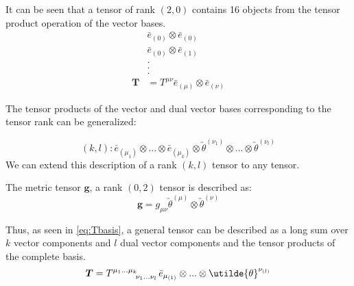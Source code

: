 \documentclass[11pt]{article}
\begin{document}
	It can be seen that a tensor of rank $(2,0)$ contains 16 objects from the tensor product operation of the vector bases.
	\begin{equation}
	\begin{aligned}
	&\bar{e}_{(0)} \otimes \bar{e}_{(0)}\\
	&\bar{e}_{(0)} \otimes \bar{e}_{(1)} \\
	&. \\
	&. \\
	&. \\
	\boldsymbol{T} &= T^{\mu\nu} \bar{e}_{(\mu)} \otimes \bar{e}_{(\nu)}
	\label{eq:Tobjects}
	\end{aligned}
	\end{equation}
	
	The tensor products of the vector and dual vector bases corresponding to the tensor rank can be generalized:
	
	\begin{equation}
	(k,l) : \bar{e}_{(\mu_{1})} \otimes ... \otimes \bar{e}_{(\mu_{k})} \otimes \utilde{\theta}^{(\nu_{1})} \otimes ... \otimes \utilde{\theta}^{(\nu_{l})}
	\label{eq:Trank}
	\end{equation}
	We can extend this description of a rank $(k,l)$ tensor to any tensor.
	\begin{example}
	The metric tensor $\boldsymbol{g}$, a rank $(0,2)$ tensor is described as:
	\begin{equation}
	\boldsymbol{g} = g_{\mu\nu} \utilde{\theta}^{(\mu)} \otimes \utilde{\theta}^{(\nu)}
	\end{equation}
	\end{example}
	Thus, as seen in \eqref{eq:Tbasis}, a general tensor can be described as a long sum over $k$ vector components and $l$ dual vector components and the tensor products of the complete basis.
	\begin{equation}
	\boldsymbol{T} = \tensor{T}{^{\mu_{1}}^{\dots}^{\mu_{k}}_{\nu_{1}}_{\dots}_{\nu_{l}}} \bar{e}_{\mu_{(1)}} \otimes ... \otimes \utilde{\theta}^{\nu_{(l)}}
	\label{eq:Tbasis}
	\end{equation}
	
\end{document}
